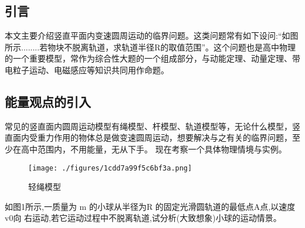 

\subsection{引言}
本文主要介绍竖直平面内变速圆周运动的临界问题。这类问题常有如下设问:“如图所示........若物块不脱离轨道，求轨道半径R的取值范围”。这个问题也是高中物理的一个重要模型，常作为综合性大题的一个组成部分，与动能定理、动量定理、带电粒子运动、电磁感应等知识共同用作命题。

\subsection{能量观点的引入}
常见的竖直面内圆周运动模型有绳模型、杆模型、轨道模型等，无论什么模型，竖直面内受重力作用的物体总是做变速圆周运动，想要解决与之有关的临界问题，至少在高中范围内，不用能量，无从下手。
现在考察一个具体物理情境与实例。
\begin{figure}[ht]
\centering
\texttt{[image: ./figures/1cdd7a99f5c6bf3a.png]}
\caption{轻绳模型} \label{fig_CirVer_1}
\end{figure}
如图1所示,一质量为 m 的小球从半径为R 的固定光滑圆轨道的最低点A点,以速度v0向
右运动,若它运动过程中不脱离轨道,试分析(大致想象)小球的运动情景。
